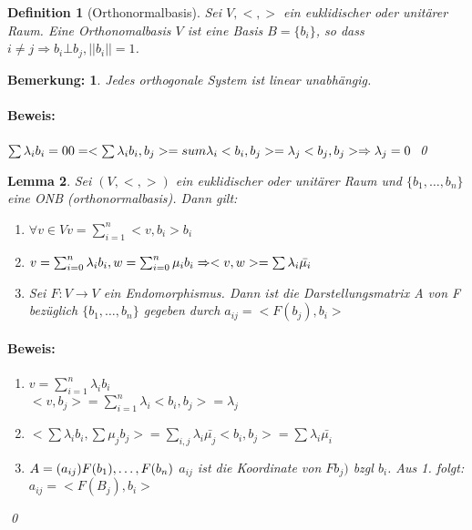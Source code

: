 \documentclass{report}
\newcommand{\lb}{\lambda}
\theoremstyle{customrem}
\newtheorem*{bemerkung}{Bemerkung\textnormal:}
\theoremstyle{customdef}
\newtheorem{definition}{Definition}[chapter]
\newtheorem{lemma}[definition]{Lemma}
\renewenvironment{proof}{\paragraph{Beweis: }}{\qed}
\theoremstyle{customenv}
\begin{document}
\begin{definition}[Orthonormalbasis]
  Sei \(V, <, >\) ein euklidischer oder unit\"arer Raum. Eine Orthonomalbasis
  \(V\) ist eine Basis \(B = \{b_i\}\), so dass
  \(i \neq j \Rightarrow b_i \bot b_j, ||b_i|| = 1\).\\
\end{definition}

\begin{bemerkung}
  Jedes orthogonale System ist linear unabh\"angig.
  \begin{proof}
    \(\sum \lb_i b_i = 0\\
    0
    = <\sum\lb_i b_i, b_j>
    = sum \lb_i <b_i, b_j>
    = \lb_j <b_j, b_j>
    \Rightarrow \lb_j = 0
    \)
  \end{proof}
\end{bemerkung}

\begin{lemma}
  Sei \((V, <, >)\) ein euklidischer oder unit\"arer Raum und
  \(\{b_1, \dots, b_n\}\) eine ONB (orthonormalbasis). Dann gilt:\\
  \begin{enumerate}
    \item {
      \(\forall v \in V v = \sum_{i=1}^n <v, b_i> b_i\)
    }
    \item {
      \(v = \sum_{i=0}^n \lb_i b_i, w = \sum_{i=0}^n \mu_i b_i\\
      \Rightarrow <v, w> = \sum \lb_i \bar{\mu_i}\)
    }
    \item {
      Sei \(F : V \to V\) ein Endomorphismus. Dann ist die Darstellungsmatrix
      A von F bez\"uglich \(\{b_1, \dots, b_n\}\) gegeben durch
      \(a_{ij} = <F(b_j), b_i>\)
    }
  \end{enumerate}
  
  \begin{proof}
    \begin{enumerate}
      \item {
        \(v = \sum_{i=1}^n \lb_i b_i\)\\
        \(<v, b_j> = \sum_{i=1}^n \lb_i <b_i, b_j> = \lb_j\)
      }
      \item {
        \(<\sum \lb_i b_i, \sum \mu_j b_j>
        = \sum_{i, j} \lb_i \bar{\mu_j} <b_i, b_j>
        = \sum \lb_i \bar{\mu_i}
        \)
      }
      \item {
        \(
          A = (a_{ij})\\
          F(b_1), \dots, F(b_n)\\
        \)
        \(a_{ij}\) ist die Koordinate von \(Fb_j)\) bzgl \(b_i\). Aus 1. folgt:
        \(a_{ij} = <F(B_j), b_i>\)
      }
    \end{enumerate}
  \end{proof}
\end{lemma} 
\end{document}
